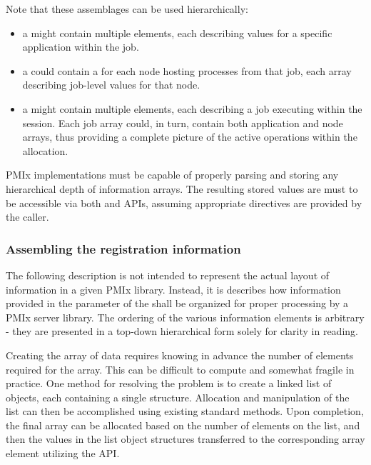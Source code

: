Note that these assemblages can be used hierarchically:

\begin{itemize}
\item a  might contain multiple  elements, each describing values for a specific application within the job.
\item a  could contain a  for each node hosting processes from that job, each array describing job-level values for that node.
\item a  might contain multiple  elements, each describing a job executing within the session. Each job array could, in turn, contain both application and node arrays, thus providing a complete picture of the active operations within the allocation.
\end{itemize}

\adviceimplstart
\ac{PMIx} implementations must be capable of properly parsing and storing any hierarchical depth of information arrays. The resulting stored values are must to be accessible via both  and  \acp{API}, assuming appropriate directives are provided by the caller.
\adviceimplend

\subsubsection{Assembling the registration information}
\label{chap:api_server:assemble}

The following description is not intended to represent the actual layout of information in a given \ac{PMIx} library. Instead, it is describes how information provided in the  parameter of the  shall be organized for proper processing by a \ac{PMIx} server library. The ordering of the various information elements is arbitrary - they are presented in a top-down hierarchical form solely for clarity in reading.

\advicermstart
Creating the  array of data requires knowing in advance the number of elements required for the array. This can be difficult to compute and somewhat fragile in practice. One method for resolving the problem is to create a linked list of objects, each containing a single  structure. Allocation and manipulation of the list can then be accomplished using existing standard methods. Upon completion, the final  array can be allocated based on the number of elements on the list, and then the values in the list object  structures transferred to the corresponding array element utilizing the  \ac{API}.
\advicermend

